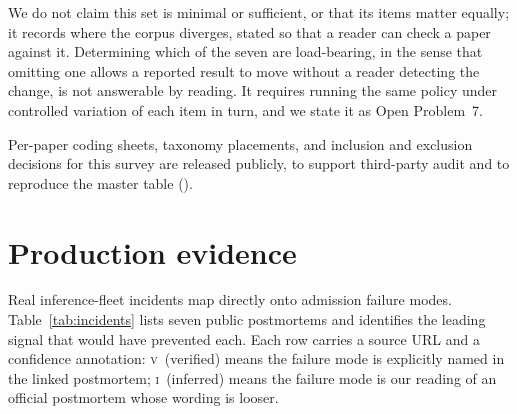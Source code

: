 We do not claim this set is minimal or sufficient, or that its items
matter equally; it records where the corpus diverges, stated so that a
reader can check a paper against it. Determining which of the seven are
load-bearing, in the sense that omitting one allows a reported result to
move without a reader detecting the change, is not answerable by
reading. It requires running the same policy under controlled variation
of each item in turn, and we state it as Open Problem~7.

Per-paper coding sheets, taxonomy placements, and inclusion and
exclusion decisions for this survey are released publicly, to support
third-party audit and to reproduce the master table
(\artifacturl).

\section{Production evidence}
\label{sec:prod}

Real inference-fleet incidents map directly onto admission failure
modes. Table~\ref{tab:incidents} lists seven public postmortems and
identifies the leading signal that would have prevented each. Each
row carries a source URL and a confidence annotation:
\textsc{v}~(verified) means the failure mode is explicitly named in
the linked postmortem; \textsc{i}~(inferred) means the failure mode
is our reading of an official postmortem whose wording is looser.

